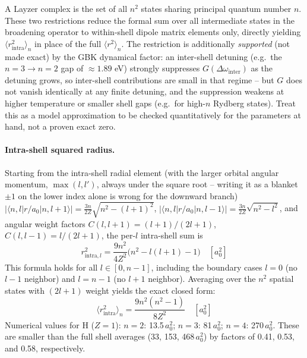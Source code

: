 \documentclass[11pt,a4paper]{article}
\numberwithin{equation}{section}
\begin{document}
A Layzer complex is the set of all $n^2$ states sharing principal quantum number $n$.
These two restrictions reduce the formal sum over all intermediate states in the
broadening operator to within-shell dipole matrix elements only, directly yielding
$\langle r^2_\mathrm{intra}\rangle_n$ in place of the full $\langle r^2\rangle_n$.
The restriction is additionally \emph{supported} (not made exact) by the GBK dynamical factor: an inter-shell
detuning (e.g.\ the $n=3 \to n=2$ gap of $\approx 1.89$ eV) strongly suppresses $G(\Delta\omega_\mathrm{inter})$ as the detuning grows, so inter-shell
contributions are small in that regime -- but $G$ does not vanish identically at any finite
detuning, and the suppression weakens at higher temperature or smaller shell gaps (e.g.\ for
high-$n$ Rydberg states). Treat this as a model approximation to be checked quantitatively for
the parameters at hand, not a proven exact zero.

\paragraph{Intra-shell squared radius.}
Starting from the intra-shell radial element (with the larger orbital angular
momentum, $\max(l,l')$, always under the square root -- writing it as a blanket
$\pm1$ on the lower index alone is wrong for the downward branch)
$|\langle n,l|r/a_0|n,l+1\rangle| = \tfrac{3n}{2Z}\sqrt{n^2-(l+1)^2}$,
$|\langle n,l|r/a_0|n,l-1\rangle| = \tfrac{3n}{2Z}\sqrt{n^2-l^2}$,
and angular weight factors $C(l,l+1)=(l+1)/(2l+1)$, $C(l,l-1)=l/(2l+1)$,
the per-$l$ intra-shell sum is
\begin{equation}
r^2_{\mathrm{intra},l} = \frac{9n^2}{4Z^2}\bigl(n^2 - l(l+1) - 1\bigr)
\quad [a_0^2]
\end{equation}
This formula holds for all $l \in [0, n-1]$, including the boundary cases $l=0$
(no $l-1$ neighbor) and $l=n-1$ (no $l+1$ neighbor).
Averaging over the $n^2$ spatial states with $(2l+1)$ weight yields the exact
closed form:
\begin{equation}
\langle r^2_\mathrm{intra}\rangle_n = \frac{9n^2(n^2-1)}{8Z^2}
\quad [a_0^2]
\end{equation}
Numerical values for H ($Z=1$): $n=2$: 13.5\,$a_0^2$; $n=3$: 81\,$a_0^2$;
$n=4$: 270\,$a_0^2$.  These are smaller than the full shell averages
(33, 153, 468\,$a_0^2$) by factors of 0.41, 0.53, and 0.58, respectively.
\end{document}
